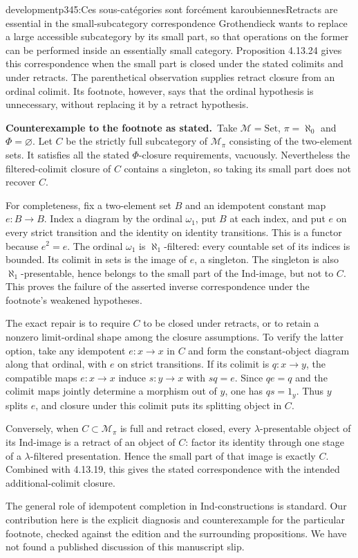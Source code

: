 \begin{dcomment}{development}{p345:Ces sous-catégories sont forcément karoubiennes}{Retracts are essential in the small-subcategory correspondence}
Grothendieck wants to replace a large accessible subcategory by its small part, so that operations on the former can be performed inside an essentially small category. Proposition 4.13.24 gives this correspondence when the small part is closed under the stated colimits and under retracts. The parenthetical observation supplies retract closure from an ordinal colimit. Its footnote, however, says that the ordinal hypothesis is unnecessary, without replacing it by a retract hypothesis.

\textbf{Counterexample to the footnote as stated.}\ours\ Take $\mathcal M=\mathrm{Set}$, $\pi=\aleph_0$ and $\Phi=\varnothing$. Let $C$ be the strictly full subcategory of $\mathcal M_\pi$ consisting of the two-element sets. It satisfies all the stated $\Phi$-closure requirements, vacuously. Nevertheless the filtered-colimit closure of $C$ contains a singleton, so taking its small part does not recover $C$.

For completeness, fix a two-element set $B$ and an idempotent constant map $e:B\to B$. Index a diagram by the ordinal $\omega_1$, put $B$ at each index, and put $e$ on every strict transition and the identity on identity transitions. This is a functor because $e^2=e$. The ordinal $\omega_1$ is $\aleph_1$-filtered: every countable set of its indices is bounded. Its colimit in sets is the image of $e$, a singleton. The singleton is also $\aleph_1$-presentable, hence belongs to the small part of the Ind-image, but not to $C$. This proves the failure of the asserted inverse correspondence under the footnote's weakened hypotheses.

The exact repair is to require $C$ to be closed under retracts, or to retain a nonzero limit-ordinal shape among the closure assumptions. To verify the latter option, take any idempotent $e:x\to x$ in $C$ and form the constant-object diagram along that ordinal, with $e$ on strict transitions. If its colimit is $q:x\to y$, the compatible maps $e:x\to x$ induce $s:y\to x$ with $sq=e$. Since $qe=q$ and the colimit maps jointly determine a morphism out of $y$, one has $qs=1_y$. Thus $y$ splits $e$, and closure under this colimit puts its splitting object in $C$.

Conversely, when $C\subset\mathcal M_\pi$ is full and retract closed, every $\lambda$-presentable object of its Ind-image is a retract of an object of $C$: factor its identity through one stage of a $\lambda$-filtered presentation. Hence the small part of that image is exactly $C$. Combined with 4.13.19, this gives the stated correspondence with the intended additional-colimit closure.

The general role of idempotent completion in Ind-constructions is standard. Our contribution here is the explicit diagnosis and counterexample for the particular footnote, checked against the edition and the surrounding propositions. We have not found a published discussion of this manuscript slip.
\end{dcomment}

